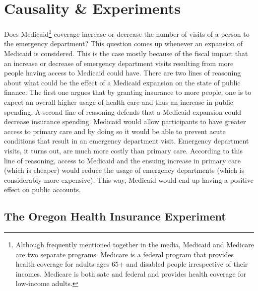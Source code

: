 
\newpage

\section{Causality \& Experiments}

Does Medicaid\footnote{Although frequently mentioned together in the media, Medicaid and Medicare are two separate programs. Medicare is a federal program that provides health coverage for adults ages 65+ and disabled people irrespective of their incomes. Medicare is both sate and federal and provides health coverage for low-income adults.} coverage increase or decrease the number of visits of a person to the emergency department? This question comes up whenever an expansion of Medicaid is considered. This is the case mostly because of the fiscal impact that an increase or decrease of emergency department visits resulting from more people having access to Medicaid could have. There are two lines of reasoning about what could be the effect of a Medicaid expansion on the state of public finance. The first one argues that by granting insurance to more people, one is to expect an overall higher usage of health care and thus an increase in public spending. A second line of reasoning defends that a Medicaid expansion could decrease insurance spending. Medicaid would allow participants to have greater access to primary care and by doing so it would be able to prevent acute conditions that result in an emergency department visit. Emergency department visits, it turns out, are much more costly than primary care. According to this line of reasoning, access to Medicaid and the ensuing increase in primary care (which is cheaper) would reduce the usage of emergency departments (which is considerably more expensive). This way, Medicaid would end up having a positive effect on public accounts.

\subsection{The Oregon Health Insurance Experiment}

